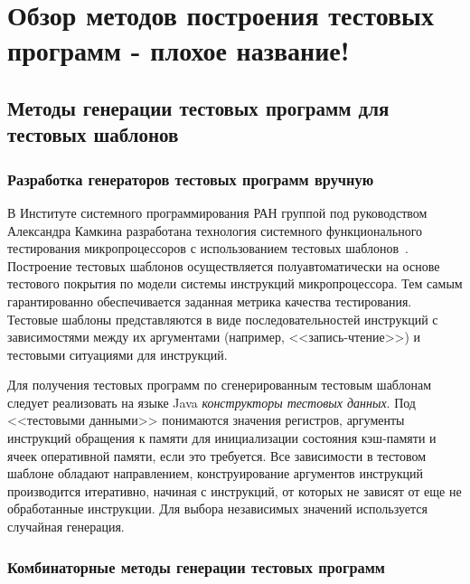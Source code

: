 \chapter{Обзор методов построения тестовых программ - плохое название!}

\section{Методы генерации тестовых программ для тестовых шаблонов}

\subsection{Разработка генераторов тестовых программ вручную}

В Институте системного программирования РАН группой под руководством
Александра Камкина разработана технология системного функционального
тестирования микропроцессоров с использованием тестовых
шаблонов~\cite{kamkin, vorobyev}. Построение тестовых шаблонов
осуществляется полуавтоматически на основе тестового покрытия по
модели системы инструкций микропроцессора. Тем самым гарантированно
обеспечивается заданная метрика качества тестирования. Тестовые
шаблоны представляются в виде последовательностей инструкций с
зависимостями между их аргументами (например, <<запись-чтение>>) и
тестовыми ситуациями для инструкций.

Для получения тестовых программ по сгенерированным тестовым шаблонам
следует реализовать на языке Java \emph{конструкторы тестовых
данных}. Под <<тестовыми данными>> понимаются значения регистров,
аргументы инструкций обращения к памяти для инициализации состояния
кэш-памяти и ячеек оперативной памяти, если это требуется. Все
зависимости в тестовом шаблоне обладают направлением,
конструирование аргументов инструкций производится итеративно,
начиная с инструкций, от которых не зависят от еще не обработанные
инструкции. Для выбора независимых значений используется случайная
генерация.


\subsection{Комбинаторные методы генерации тестовых программ}


